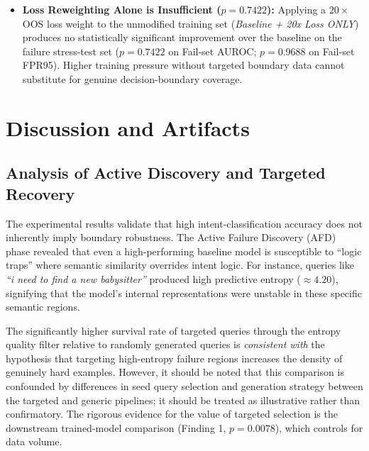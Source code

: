 \documentclass[11pt,a4paper]{article}
\begin{document}
\begin{itemize}
    \item \textbf{Loss Reweighting Alone is Insufficient ($p = 0.7422$):} Applying a $20\times$ OOS loss weight to the unmodified training set (\textit{Baseline + 20x Loss ONLY}) produces no statistically significant improvement over the baseline on the failure stress-test set ($p = 0.7422$ on Fail-set AUROC; $p = 0.9688$ on Fail-set FPR95). Higher training pressure without targeted boundary data cannot substitute for genuine decision-boundary coverage.
\end{itemize}

\section{Discussion and Artifacts}

\subsection{Analysis of Active Discovery and Targeted Recovery}
The experimental results validate that high intent-classification accuracy does not inherently imply boundary robustness. The Active Failure Discovery (AFD) phase revealed that even a high-performing baseline model is susceptible to ``logic traps'' where semantic similarity overrides intent logic. For instance, queries like \textit{``i need to find a new babysitter''} produced high predictive entropy ($\approx 4.20$), signifying that the model's internal representations were unstable in these specific semantic regions.

The significantly higher survival rate of targeted queries through the entropy quality filter relative to randomly generated queries is \emph{consistent with} the hypothesis that targeting high-entropy failure regions increases the density of genuinely hard examples. However, it should be noted that this comparison is confounded by differences in seed query selection and generation strategy between the targeted and generic pipelines; it should be treated as illustrative rather than confirmatory. The rigorous evidence for the value of targeted selection is the downstream trained-model comparison (Finding 1, $p = 0.0078$), which controls for data volume.
\end{document}
